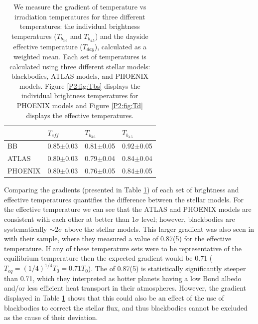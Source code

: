\begin{subappendices}
\begin{table}[]
    \caption{We measure the gradient of temperature vs irradiation temperatures for three different temperatures: the individual brightness temperatures ($T_{b_{3.6}}$ and $T_{b_{4.5}}$) and the dayside effective temperature ($T_{day}$), calculated as a weighted mean. Each set of temperatures is calculated using three different stellar models: blackbodies, ATLAS models, and PHOENIX models. Figure \ref{P2:fig:Tbs} displays the individual brightness temperatures for PHOENIX models and Figure \ref{P2:fig:Td} displays the effective temperatures.}
    \centering
    \begin{tabular}{l l l l }
    \hline\hline
          &   $T_{eff}$     & $T_{b_{3.6}}$ & $T_{b_{4.5}}$ \\
    \hline
    BB    &   0.85$\pm$0.03 & 0.81$\pm$0.05 & 0.92$\pm$0.05 \\
    ATLAS &   0.80$\pm$0.03 & 0.79$\pm$0.04 & 0.84$\pm$0.04\\
    PHOENIX & 0.80$\pm$0.03 & 0.76$\pm$0.05 & 0.84$\pm$0.05 \\
    \hline
    \end{tabular}

    \label{P2:tab:slopes}
\end{table}



Comparing the gradients (presented in Table \ref{P2:tab:slopes}) of each set of brightness and effective temperatures quantifies the difference between the stellar models. For the effective temperature we can see that the ATLAS and PHOENIX models are consistent with each other at better than $1\sigma$ level; however, blackbodies are systematically $\sim2\sigma$ above the stellar models. This larger gradient was also seen in \citet{Schwartz2015} with their sample, where they measured a value of 0.87(5) for the effective temperature. If any of these temperature sets were to be representative of the equilibrium temperature then the expected gradient would be 0.71 ($T_{eq} = (1/4)^{1/4}T_0 = 0.71 T_0$). The \citet{Schwartz2015} of 0.87(5) is statistically significantly steeper than 0.71, which they interpreted as hotter planets having a low Bond albedo and/or less efficient heat transport in their atmospheres. However, the gradient displayed in Table \ref{P2:tab:slopes} shows that this could also be an effect of the use of blackbodies to correct the stellar flux, and thus blackbodies cannot be excluded as the cause of their deviation.


\end{subappendices}
